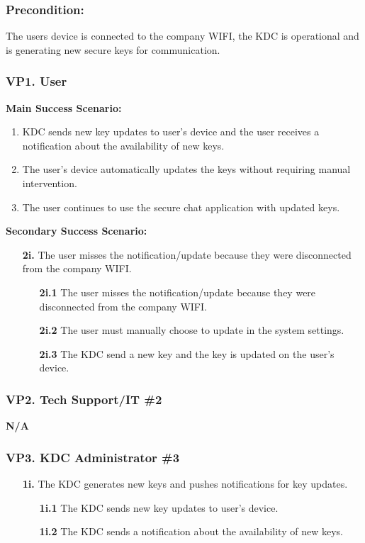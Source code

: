 \documentclass[]{article}
\begin{document}
\subsubsection*{Precondition:} The users device is connected to the company WIFI, the KDC is operational and is generating new secure keys for communication.
\subsubsection*{VP1. User}
\textbf{Main Success Scenario:}
\begin{enumerate}
	\item KDC sends new key updates to user’s device and the user receives a notification about the availability of new keys.
	\item The user's device automatically updates the keys without requiring manual intervention.
	\item The user continues to use the secure chat application with updated keys.
\end{enumerate}
\textbf{Secondary Success Scenario:}
\begin{enumerate}
	\item[\textbf{2i.}] The user misses the notification/update because they were disconnected from the company WIFI.
		\begin{enumerate}
			\item[\textbf{2i.1}] The user misses the notification/update because they were disconnected from the company WIFI.
			\item[\textbf{2i.2}] The user must manually choose to update in the system settings.
			\item[\textbf{2i.3}] The KDC send a new key and the key is updated on the user's device.
		\end{enumerate}
\end{enumerate}
\subsubsection*{VP2. Tech Support/IT \#2}
\textbf{N/A}
\subsubsection*{VP3. KDC Administrator \#3}
\begin{enumerate}
	\item[\textbf{1i.}] The KDC generates new keys and pushes notifications for key updates.
		\begin{enumerate}
			\item[\textbf{1i.1}] The KDC sends new key updates to user’s device.
			\item[\textbf{1i.2}] The KDC sends a notification about the availability of new keys.
		\end{enumerate}
\end{enumerate}
\end{document}
